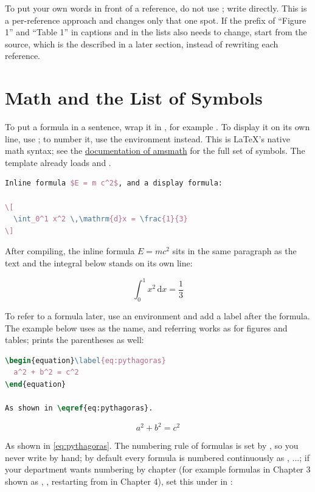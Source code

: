 To put your own words in front of a reference, do not use \code{\figref}; write  directly. This is a per-reference approach and changes only that one spot. If the prefix of ``Figure 1'' and ``Table 1'' in captions and in the lists also needs to change, start from the source, which is the  described in a later section, instead of rewriting each reference.

\section{Math and the List of Symbols}

To put a formula in a sentence, wrap it in , for example . To display it on its own line, use \code{\[ ... \]}; to number it, use the  environment instead. This is \LaTeX{}'s native math syntax; see the \href{https://ctan.org/pkg/amsmath}{documentation of amsmath} for the full set of symbols. The template already loads  and .

\begin{lstlisting}[language=latex]
Inline formula $E = m c^2$, and a display formula:

\[
  \int_0^1 x^2 \,\mathrm{d}x = \frac{1}{3}
\]
\end{lstlisting}

After compiling, the inline formula $E = m c^2$ sits in the same paragraph as the text and the integral below stands on its own line:

\[ \int_0^1 x^2 \,\mathrm{d}x = \frac{1}{3} \]

To refer to a formula later, use an  environment and add a label after the formula. The example below uses  as the name, and referring works as for figures and tables; \code{\eqref} prints the parentheses as well:

\begin{lstlisting}[language=latex]
\begin{equation}\label{eq:pythagoras}
  a^2 + b^2 = c^2
\end{equation}

As shown in \eqref{eq:pythagoras}.
\end{lstlisting}

\begin{equation}\label{eq:pythagoras}
  a^2 + b^2 = c^2
\end{equation}

As shown in \eqref{eq:pythagoras}. The numbering rule of formulas is set by , so you never write  by hand; by default every formula is numbered continuously as , ...; if your department wants numbering by chapter (for example formulas in Chapter 3 shown as , , restarting from  in Chapter 4), set this under  in :

